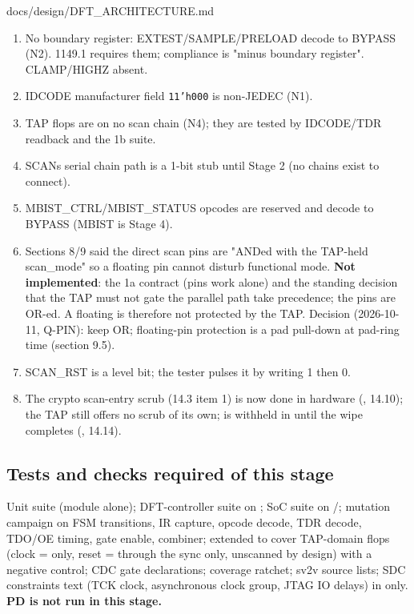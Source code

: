 \begin{relocated}{docs/design/DFT_ARCHITECTURE.md}
\begin{enumerate}
\def\labelenumi{\arabic{enumi}.}
\tightlist
\item
  No boundary register: EXTEST/\allowbreak{}SAMPLE/\allowbreak{}PRELOAD
  decode to BYPASS (N2). 1149.1 requires them; compliance is "minus
  boundary register". CLAMP/\allowbreak{}HIGHZ absent.
\item
  IDCODE manufacturer field \texttt{11'h000} is non-JEDEC (N1).
\item
  TAP flops are on no scan chain (N4); they are tested by
  IDCODE/\allowbreak{}TDR readback and the 1b suite.
\item
  SCAN\textquotesingle s serial chain path is a 1-bit stub until Stage 2
  (no chains exist to connect).
\item
  MBIST\_\allowbreak{}CTRL/\allowbreak{}MBIST\_\allowbreak{}STATUS
  opcodes are reserved and decode to BYPASS (MBIST is Stage 4).
\item
  Sections 8/9 said the direct scan pins are "ANDed with the TAP-held
  scan\_\allowbreak{}mode" so a floating pin cannot disturb functional
  mode. \textbf{Not implemented}: the 1a contract (pins work alone) and
  the standing decision that the TAP must not gate the parallel path
  take precedence; the pins are OR-ed. A floating  is
  therefore not protected by the TAP. Decision (2026-10-11, Q-PIN): keep
  OR; floating-pin protection is a pad pull-down at pad-ring time
  (section 9.5).
\item
  SCAN\_RST is a level bit; the tester pulses it by writing 1 then 0.
\item
  The crypto scan-entry scrub (14.3 item 1) is now done in
   hardware (, 14.10); the TAP still
  offers no scrub of its own;  is withheld in
   until the wipe completes (, 14.14).
\end{enumerate}

\subsection{Tests and checks required of this stage}\label{tm:ch:dft-architecture:157-tests-and-checks-required-of-this-stage}

Unit suite  (module  alone);
DFT-controller suite on ; SoC suite on
/; mutation campaign on FSM
transitions, IR capture, opcode decode, TDR decode, TDO/OE timing, gate
enable, combiner;  extended to cover
TAP-domain flops (clock =  only, reset = 
through the sync only, unscanned by design) with a negative control; CDC
gate declarations; coverage ratchet; sv2v source lists; SDC constraints
text (TCK clock, asynchronous clock group, JTAG IO delays) in
 only. \textbf{PD is not run in this stage.}


\end{relocated}
